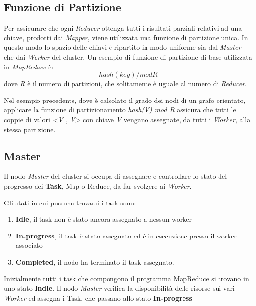 \documentclass[LaM,binding=0.6cm]{sapthesis}
\begin{document}
\subsection{Funzione di Partizione}

Per assicurare che ogni \textit{Reducer} ottenga tutti i risultati parziali relativi ad una chiave, prodotti dai \textit{Mapper}, viene utilizzata una funzione di partizione unica. In questo modo lo spazio delle chiavi è ripartito in modo uniforme sia dal \textit{Master} che dai \textit{Worker} del cluster.
Un esempio di funzione di partizione di base utilizzata in \textit{MapReduce} \cite{Dean:2008:MSD:1327452.1327492} è:
\begin{equation*}
	hash(key) / mod R 
\end{equation*}
dove \textit{R} è il numero di partizioni, che solitamente è uguale al numero di \textit{Reducer}.

Nel esempio precedente, dove è calcolato il grado dei nodi di un grafo orientato, applicare la funzione di partizionamento \textit{hash(V) mod R} assicura che tutti le coppie di valori \textit{<V , V>} con chiave \textit{V} vengano assegnate, da tutti i \textit{Worker}, alla stessa partizione.

\subsection{Master}

Il nodo \textit{Master} del cluster si occupa di assegnare e controllare lo stato del progresso dei \textbf{Task}, Map o Reduce, da far svolgere ai \textit{Worker}.

Gli stati in cui possono trovarsi i task sono:
\begin{enumerate}
\item \textbf{Idle}, il task non è stato ancora assegnato a nessun worker
\item \textbf{In-progress}, il task è stato assegnato ed è in esecuzione presso il worker associato
\item \textbf{Completed}, il nodo ha terminato il task assegnato.
\end{enumerate}
Inizialmente tutti i task che compongono il programma MapReduce si trovano in uno stato \textbf{Indle}. Il nodo \textit{Master} verifica la disponibilità delle risorse sui vari \textit{Worker} ed assegna i Task, che passano allo stato \textbf{In-progress}
\end{document}
